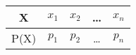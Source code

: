 \begin{center}
    \begin{tabular}{|c|c|c|c|c|} 
        \hline
        X & $x_1$ & $x_2$ & \dots & $x_n$ \\ 
        \hline
        P(X) & $p_1$ & $p_2$ & \dots & $p_n$ \\ 
        \hline
    \end{tabular}
\end{center}